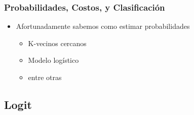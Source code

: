 \documentclass[
  shownotes,
  xcolor={svgnames},
  hyperref={colorlinks,citecolor=DarkBlue,linkcolor=DarkRed,urlcolor=DarkBlue}
  , aspectratio=169]{beamer}
\begin{document}
\begin{frame}[fragile]
\frametitle{Probabilidades, Costos, y Clasificación}

\begin{itemize}
  \item Afortunadamente sabemos como estimar probabilidades
  \medskip
  \begin{itemize}
    \item K-vecinos cercanos
    \item Modelo logístico
    \item entre otras
  \end{itemize}
\medskip
\end{itemize}


\end{frame}

\subsection{Logit}
\end{document}
